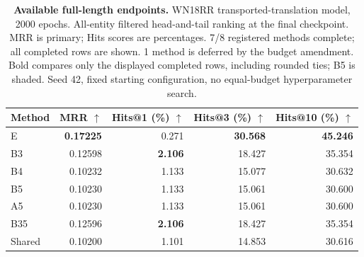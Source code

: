\begin{table}[!htbp]
\centering
\caption{\textbf{Available full-length endpoints.} WN18RR transported-translation model, 2000 epochs. All-entity filtered head-and-tail ranking at the final checkpoint. MRR is primary; Hits scores are percentages. 7/8 registered methods complete; all completed rows are shown. 1 method is deferred by the budget amendment. Bold compares only the displayed completed rows, including rounded ties; B5 is shaded. Seed 42, fixed starting configuration, no equal-budget hyperparameter search.}
\label{tab:revision-kg-audit}
\footnotesize\setlength{\tabcolsep}{5pt}\renewcommand{\arraystretch}{1.12}
\begin{tabular}{lrrrr}
\toprule
Method & MRR $\uparrow$ & Hits@1 (\%) $\uparrow$ & Hits@3 (\%) $\uparrow$ & Hits@10 (\%) $\uparrow$ \\
\midrule
E & \textbf{0.17225} & 0.271 & \textbf{30.568} & \textbf{45.246} \\
B3 & 0.12598 & \textbf{2.106} & 18.427 & 35.354 \\
B4 & 0.10232 & 1.133 & 15.077 & 30.632 \\
\rowcolor{oursbg}
B5 & 0.10230 & 1.133 & 15.061 & 30.600 \\
A5 & 0.10230 & 1.133 & 15.061 & 30.600 \\
B35 & 0.12596 & \textbf{2.106} & 18.427 & 35.354 \\
Shared & 0.10200 & 1.101 & 14.853 & 30.616 \\
\bottomrule
\end{tabular}
\end{table}
